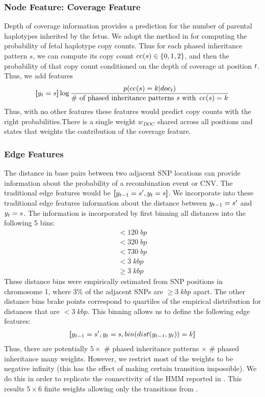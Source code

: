 \subsubsection{Node Feature: Coverage Feature}
Depth of coverage information provides a prediction for the number of parental haplotypes inherited by the fetus. We adopt the method in \citet{rampasek2014fcnv}  for computing the probability of fetal haplotype copy counts. Thus for each phased inheritance pattern $s$, we can compute its copy count $\operatorname*{cc}(s) \in \{0, 1, 2\}$, and then the probability of that copy count conditioned on the depth of coverage at position $t$. Thus, we add features
\begin{align*}
\bm{[}y_{t} = s\bm{]}\log \frac{p(\operatorname*{cc}(s) = k | doc_{t})}{\text{\# of phased inheritance patterns $s$ with } \operatorname*{cc}(s) = k}
\end{align*}
Thus, with no other features these features would predict copy counts with the right probabilities.There is a single weight $w_{DOC}$ shared across all positions and states that weights the contribution of the coverage feature.

\subsubsection{Edge Features}
The distance in base pairs between two adjacent SNP locations can provide information about the probability of a recombination event or CNV. The traditional edge features would be $\bm{[}y_{t-1} = s^{\prime} , y_{t} = s\bm{]}$. We incorporate into these traditional edge features information about the distance between $y_{t-1} = s^{\prime}$ and $y_{t} = s$. The information is incorporated by first binning all distances into the following 5 bins: 
\begin{align*}
< 120 \; bp\\
< 320 \; bp\\
< 730 \; bp\\
< 3 \; kbp\\
\geq 3 \; kbp
\end{align*}
These distance bins were empirically estimated from SNP positions in chromosome 1, where $3\%$ of the adjacent SNPs are $\geq 3\;kbp$ apart. The other distance bins brake points correspond to quartiles of the empirical distribution for distances that are $< 3\;kbp$.
This binning allows us to define the following edge features:
\begin{align*}
\bm{[}y_{t-1} = s^{\prime} , y_{t} = s, bin(dist(y_{t-1} , y_{t} )) = k\bm{]}
\end{align*}
Thus, there are potentially $5 \times $ \# phased inheritance patterns $\times $ \# phased inheritance many weights. However, we restrict most of the weights to be negative infinity (this has the effect of making certain transition impossible). We do this in order to replicate the connectivity of the HMM reported in \citet{rampasek2014fcnv}. This results $5 \times 6$ finite weights allowing only the transitions from \citet{rampasek2014fcnv}.

